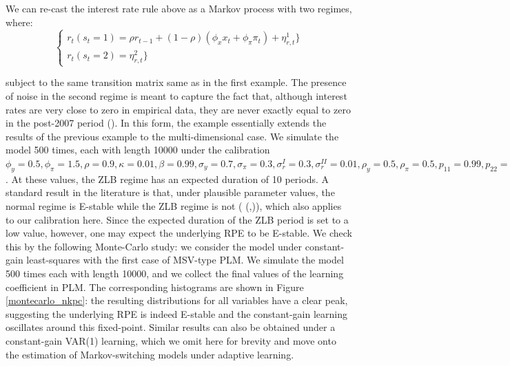 \documentclass[12pt,reqno]{article}
\numberwithin{equation}{section}
\begin{document}
We can re-cast the interest rate rule above as a Markov process with two regimes, where: \\

$$
\begin{cases}
r_t (s_t=1) = \rho r_{t-1} +(1-\rho) (\phi_x x_t + \phi_{\pi} \pi_t) + \eta^{1}_{r,t}\} \\
r_t (s_t=2) =\eta^{2}_{r,t}\} 
\end{cases}
$$

subject to the same transition matrix same as in the first example. The presence of noise in the second regime is meant to capture the fact that, although interest rates are very close to zero in empirical data, they are never exactly equal to zero in the post-2007 period (\cite{linde2017estimation}). In this form, the example essentially extends the results of the previous example to the multi-dimensional case. We simulate the model 500 times, each with length 10000 under the calibration $\phi_y =0.5, \phi_{\pi}=1.5, \rho=0.9, \kappa=0.01, \beta=0.99, \sigma_y = 0.7, \sigma_{\pi} =0.3, \sigma^{I}_r =0.3, \sigma^{II}_r=0.01,\rho_y =0.5, \rho_{\pi}=0.5 , p_{11} = 0.99, p_{22} = 0.9, \gamma = 0.01$. At these values,  the ZLB regime has an expected duration of 10 periods. A standard result in the literature is that, under plausible parameter values, the normal regime is E-stable while the ZLB regime is not (\citeauthor{evans2008liquidity} (\citeyear{evans2008liquidity},\citeyear{evans201011})), which also applies to our calibration here. Since the expected duration of the ZLB period is set to a low value, however, one may expect the underlying RPE to be E-stable. We check this by the following Monte-Carlo study: we consider the model under constant-gain least-squares with the first case of MSV-type PLM. We simulate the model 500 times each with length 10000, and we collect the final values of the learning coefficient in PLM. The corresponding histograms are shown in Figure \ref{montecarlo_nkpc}: the resulting distributions for all variables have a clear peak, suggesting the underlying RPE is indeed E-stable and the constant-gain learning oscillates around this fixed-point. Similar results can also be obtained under a constant-gain VAR(1) learning, which we omit here for brevity and move onto the estimation of Markov-switching models under adaptive learning. 
\end{document}
